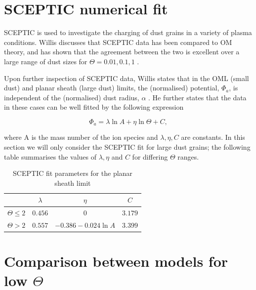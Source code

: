 \documentclass{article}
\begin{document}
    
\section{SCEPTIC numerical fit}

\smallskip

SCEPTIC is used to investigate the charging of dust grains in a variety
of plasma conditions. Willis discusses that SCEPTIC data has been compared
to OM theory, and has shown that the agreement between the two is excellent over a large range of dust sizes 
for $\Theta = 0.01,0.1,1$ \cite{ScepticFit}.

\medskip

Upon further inspection of SCEPTIC data, Willis states that in the OML (small dust)
and planar sheath (large dust) limits, the (normalised) potential, $\Phi_a$, is independent of the (normalised)
dust radius, $\alpha$ \cite{ScepticFit}. He further states that the data in these cases can
be well fitted by the following expression

\begin{equation}\label{eq:SCEPTICfit}
\Phi_a = \lambda \ln{A} + \eta \ln{\Theta} + C,
\end{equation}

\smallskip

\noindent where A is the mass number of the ion species and $\lambda, \eta, C$ are 
constants. In this section we will only consider the SCEPTIC
fit for large dust grains; the following table summarises the values of $\lambda, \eta$ and $C$
for differing $\Theta$ ranges.

\begin{table}[h!]
\begin{center}
    \caption{SCEPTIC fit parameters for the planar sheath limit}
    \label{tab:ValueTable}
    \begin{tabular}{c|c|c|c} 
    \hline
    & $\lambda$ & $\eta$ & $C$ \\
    \hline
    $\Theta \leq 2$ & $0.456$ & $0$ & $3.179$\\
    $\Theta > 2$ & $0.557$ & $-0.386 - 0.024\ln{A}$ & $3.399$\\
    \end{tabular}
\end{center}
\end{table}


\section{Comparison between models for low $\Theta$}
\end{document}

